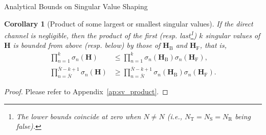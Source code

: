 \documentclass[journal]{IEEEtran}
\newtheorem{corollary}{Corollary}[proposition]
\begin{document}
\begin{section}{Analytical Bounds on Singular Value Shaping}
		\begin{corollary}[Product of some largest or smallest singular values\label{co:sv_product}]
			If the direct channel is negligible,
			then the product of the first (resp. last\footnote{The lower bounds coincide at zero when $N \ne N$ (i.e., $N_\mathrm{T} = N_\mathrm{S} = N_\mathrm{R}$ being false).}) $k$ singular values of $\mathbf{H}$ is bounded from above (resp. below) by those of $\mathbf{H}_\mathrm{B}$ and $\mathbf{H}_\mathrm{F}$, that is,
			\begin{subequations}
				\begin{align}
					\prod_{n=1}^k \sigma_n(\mathbf{H}) & \le \prod_{n=1}^k \sigma_n(\mathbf{H}_\mathrm{B}) \sigma_n(\mathbf{H}_\mathrm{F}), \label{iq:sv_product_largest} \\
					\prod_{n=\bar{N}}^{\bar{N}-k+1} \sigma_n(\mathbf{H}) & \ge \prod_{n=\bar{N}}^{\bar{N}-k+1} \sigma_n(\mathbf{H}_\mathrm{B}) \sigma_n(\mathbf{H}_\mathrm{F}). \label{iq:sv_product_smallest}
				\end{align}
			\end{subequations}
		\end{corollary}

		\begin{proof}
			Please refer to Appendix~\ref{ap:sv_product}.
		\end{proof}



\end{section}
\end{document}
